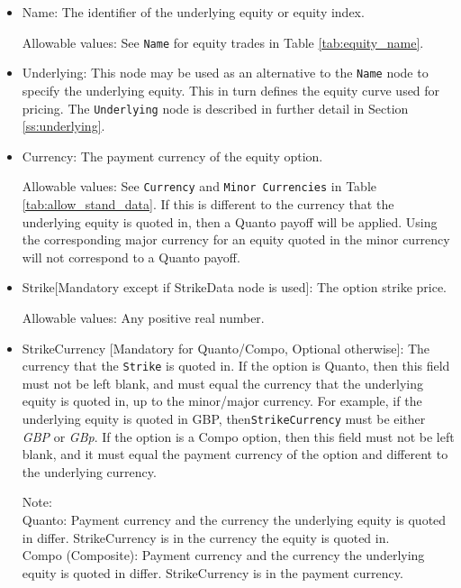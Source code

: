 \begin{itemize}
\begin{itemize}
\end{itemize}
	

	\item Name: The identifier of the underlying equity or equity index. 
	
	Allowable values: See \lstinline!Name! for equity trades in Table \ref{tab:equity_name}.
	
	\item Underlying: This node may be used as an alternative to the \lstinline!Name! node to
	specify the underlying equity. This in turn defines the equity curve used for pricing. The
	\lstinline!Underlying! node is described in further detail in Section \ref{ss:underlying}. \\
	
	\item Currency: The payment currency of the equity option. 
	
	Allowable values: See \lstinline!Currency! and \lstinline!Minor Currencies! in Table
	\ref{tab:allow_stand_data}.	If this is different to the currency that the underlying equity
	is quoted in, then a Quanto payoff will be applied. Using the corresponding major currency
	for an equity quoted in the minor currency will not correspond to a Quanto payoff.
	
	\item Strike[Mandatory except if StrikeData node is used]: The option strike price.
	
	Allowable values: Any positive real number.	
	
	\item StrikeCurrency [Mandatory for Quanto/Compo, Optional otherwise]: The currency that the \lstinline!Strike! is quoted in. If
	the option is Quanto, then this field must not be left blank, and must equal the currency
	that the underlying equity is quoted in, up to the minor/major currency. For example, if 
	the underlying equity is quoted in GBP, then\lstinline!StrikeCurrency! must be either
	\emph{GBP} or \emph{GBp}. If the option is a Compo option, then this field must not be 
	left blank, and it must equal the payment currency of the option and different to the 
	underlying currency.
	
	Note:\\
	Quanto: Payment currency and the currency the underlying equity is quoted in differ. StrikeCurrency is in the currency the equity is quoted in.\\
	Compo (Composite): Payment currency and the currency the underlying equity is quoted in differ. StrikeCurrency is in the payment currency.
	

\end{itemize}
